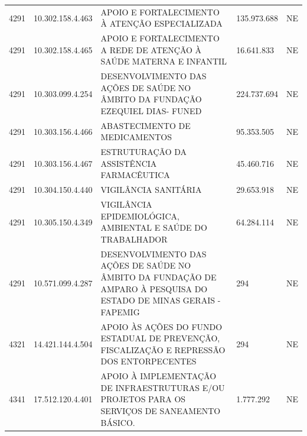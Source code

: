 \documentclass{article}
\begin{document}
\begin{longtable}[c]{m{1cm}|m{2cm}|m{10cm}|m{2cm}|m{1cm}}
\multicolumn{1}{C{1cm}|}{4291} & \multicolumn{1}{C{2cm}|}{10.302.158.4.463} & \multicolumn{1}{L{10cm}|}{APOIO E FORTALECIMENTO À ATENÇÃO ESPECIALIZADA} & \multicolumn{1}{R{2cm}|}{135.973.688} & \multicolumn{1}{C{1cm}}{NE} \\
\multicolumn{1}{C{1cm}|}{4291} & \multicolumn{1}{C{2cm}|}{10.302.158.4.465} & \multicolumn{1}{L{10cm}|}{APOIO E FORTALECIMENTO A REDE DE ATENÇÃO À SAÚDE MATERNA E INFANTIL} & \multicolumn{1}{R{2cm}|}{16.641.833} & \multicolumn{1}{C{1cm}}{NE} \\
\multicolumn{1}{C{1cm}|}{4291} & \multicolumn{1}{C{2cm}|}{10.303.099.4.254} & \multicolumn{1}{L{10cm}|}{DESENVOLVIMENTO DAS AÇÕES DE SAÚDE NO ÂMBITO DA FUNDAÇÃO EZEQUIEL DIAS- FUNED} & \multicolumn{1}{R{2cm}|}{224.737.694} & \multicolumn{1}{C{1cm}}{NE} \\
\multicolumn{1}{C{1cm}|}{4291} & \multicolumn{1}{C{2cm}|}{10.303.156.4.466} & \multicolumn{1}{L{10cm}|}{ABASTECIMENTO DE MEDICAMENTOS} & \multicolumn{1}{R{2cm}|}{95.353.505} & \multicolumn{1}{C{1cm}}{NE} \\
\multicolumn{1}{C{1cm}|}{4291} & \multicolumn{1}{C{2cm}|}{10.303.156.4.467} & \multicolumn{1}{L{10cm}|}{ESTRUTURAÇÃO DA ASSISTÊNCIA FARMACÊUTICA} & \multicolumn{1}{R{2cm}|}{45.460.716} & \multicolumn{1}{C{1cm}}{NE} \\
\multicolumn{1}{C{1cm}|}{4291} & \multicolumn{1}{C{2cm}|}{10.304.150.4.440} & \multicolumn{1}{L{10cm}|}{VIGILÂNCIA SANITÁRIA} & \multicolumn{1}{R{2cm}|}{29.653.918} & \multicolumn{1}{C{1cm}}{NE} \\
\multicolumn{1}{C{1cm}|}{4291} & \multicolumn{1}{C{2cm}|}{10.305.150.4.349} & \multicolumn{1}{L{10cm}|}{VIGILÂNCIA EPIDEMIOLÓGICA, AMBIENTAL E SAÚDE DO TRABALHADOR} & \multicolumn{1}{R{2cm}|}{64.284.114} & \multicolumn{1}{C{1cm}}{NE} \\
\multicolumn{1}{C{1cm}|}{4291} & \multicolumn{1}{C{2cm}|}{10.571.099.4.287} & \multicolumn{1}{L{10cm}|}{DESENVOLVIMENTO DAS AÇÕES DE SAÚDE NO ÂMBITO DA FUNDAÇÃO DE AMPARO À PESQUISA DO ESTADO DE MINAS GERAIS - FAPEMIG} & \multicolumn{1}{R{2cm}|}{294} & \multicolumn{1}{C{1cm}}{NE} \\
\multicolumn{1}{C{1cm}|}{4321} & \multicolumn{1}{C{2cm}|}{14.421.144.4.504} & \multicolumn{1}{L{10cm}|}{APOIO ÀS AÇÕES DO FUNDO ESTADUAL DE PREVENÇÃO, FISCALIZAÇÃO E REPRESSÃO DOS ENTORPECENTES} & \multicolumn{1}{R{2cm}|}{294} & \multicolumn{1}{C{1cm}}{NE} \\
\multicolumn{1}{C{1cm}|}{4341} & \multicolumn{1}{C{2cm}|}{17.512.120.4.401} & \multicolumn{1}{L{10cm}|}{APOIO À IMPLEMENTAÇÃO DE INFRAESTRUTURAS E/OU PROJETOS PARA OS SERVIÇOS DE SANEAMENTO BÁSICO.} & \multicolumn{1}{R{2cm}|}{1.777.292} & \multicolumn{1}{C{1cm}}{NE} \\

\end{longtable}
\end{document}
